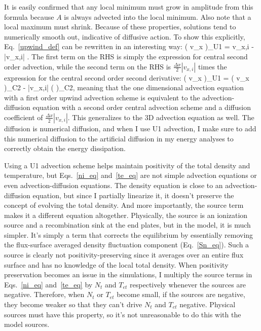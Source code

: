 It is easily confirmed that any local minimum must grow in amplitude from this formula  because $A$ is always advected into the local minimum. Also note that a local maximum must shrink. Because of these
properties, solutions tend to numerically smooth out, indicative of diffusive action. To show this explicitly, Eq.~\ref{upwind_def} can be rewritten in an interesting way:
\beq
\label{u1_exp}
\left( v_x  \right)_{U1} = v_{x,i}  -  |v_{x,i}| .
\eeq
The first term on the RHS is simply the expression for central second order advection, while the second term on the RHS is $\frac{\Delta x}{2} |v_{x,i}|$ times the expression for the central
second order second derivative:
\beq
\label{u1_symb}
\left( v_x  \right)_{U1} = \left( v_x  \right)_{C2} -  |v_{x,i}| \left(  \right)_{C2},
\eeq
meaning that the one dimensional advection equation with a first order upwind advection scheme is equivalent to the advection-diffusion equation with a second order central advection scheme 
and a diffusion coefficient of $\frac{\Delta x}{2} |v_{x,i}|$. This generalizes to the 3D advection equation as well. The diffusion is numerical diffusion, and when I use U1 advection, I make
sure to add this numerical diffusion to the artificial diffusion in my energy analyses to correctly obtain the energy dissipation.

Using a U1 advection scheme helps maintain positivity of the total density and temperature, but Eqs.~\ref{ni_eq} and~\ref{te_eq} are not simple advection equations or even advection-diffusion
equations. The density equation is close to an advection-diffusion equation, but since I partially linearize it, it doesn't preserve the concept of evolving the total density. And more
importantly, the source term makes it a different equation altogether. Physically, the source is an ionization source and a recombination sink at the end plates, but in the model, it is much
simpler. It's simply a term that corrects the equilibrium by essentially removing the flux-surface averaged density fluctuation component (Eq.~\ref{Sn_eq}). 
Such a source is clearly not positivity-preserving since it averages over an entire flux surface and has no knowledge of the local total density. When positivity preservation becomes an issue
in the simulations, I multiply the source terms in Eqs.~\ref{ni_eq} and~\ref{te_eq} by $N_{t}$ and $T_{et}$ respectively whenever the sources are negative. Therefore, when $N_{t}$ or $T_{et}$
become small, if the sources are negative, they become weaker so that they can't drive $N_{t}$ and $T_{et}$ negative. Physical sources must have this property, so it's not unreasonable
to do this with the model sources.

